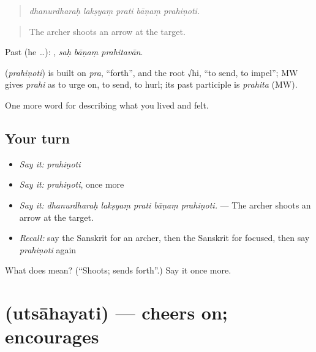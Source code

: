 \begin{quote}
    
\end{quote}

\begin{quote}
\emph{dhanurdharaḥ lakṣyaṃ prati bāṇaṃ prahiṇoti.}
\end{quote}

\begin{quote}
The archer shoots an arrow at the target.
\end{quote}

Past (he …):   , \emph{saḥ bāṇaṃ prahitavān}.

\begin{cousinweb}
\textbf{} (\emph{prahiṇoti}) is built on \emph{pra}, \textquotedblleft{}forth\textquotedblright{}, and the root √hi, \textquotedblleft{}to send, to impel\textquotedblright{}; MW gives \emph{prahi} as to urge on, to send, to hurl; its past participle is \emph{prahita} (MW).
\end{cousinweb}

\begin{grammarlens}[title={What you've built}]
One more word for describing what you lived and felt.
\end{grammarlens}

\subsection*{Your turn}
\begin{itemize}
\raggedright
  \item \emph{Say it:} \emph{prahiṇoti}
  \item \emph{Say it:} \emph{prahiṇoti}, once more
  \item \emph{Say it:} \emph{dhanurdharaḥ lakṣyaṃ prati bāṇaṃ prahiṇoti.} — The archer shoots an arrow at the target.
  \item \emph{Recall:} say the Sanskrit for an archer, then the Sanskrit for focused, then say \emph{prahiṇoti} again
\end{itemize}

\begin{tcolorbox}[breakable,colback=teal!4,colframe=teal!35!black,title={Before you move on}]
What does  mean? (\textquotedblleft{}Shoots; sends forth\textquotedblright{}.) Say it once more.
\end{tcolorbox}
\section[\texorpdfstring{\sk{उत्साहयति} (utsāhayati)}{उत्साहयति (utsāhayati)}]{ (utsāhayati) — cheers on; encourages}

